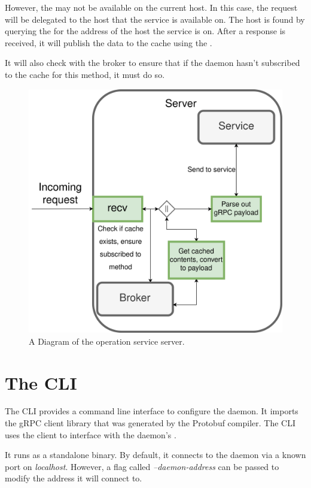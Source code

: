 \documentclass[a4paper,12pt]{report}
\begin{document}
However, the \textit{} may not be available on the current host. In this case, the request will be delegated to the host that the
service is available on. The host is found by querying the \textit{} for the address of the host the service is on.
After a response is received, it will publish the data to the cache using the \textit{}.

It will also check with the broker to ensure that if the daemon hasn't subscribed to the cache for this method, it must do so.

\begin{figure}[hbt!]
    \centering
    \includegraphics[width=\linewidth]{server.png}
    \caption{A Diagram of the operation service server.}
    \label{fig:admin}
\end{figure}

\newpage

\section{The CLI}
\label{sec:cli}
The CLI provides a command line interface to configure the daemon.
It imports the gRPC client library that was generated by the Protobuf compiler. The CLI uses the client to interface with the daemon's \textit{}.

It runs as a standalone binary. By default, it connects to the daemon via a known port on \textit{localhost}. 
However, a flag called \textit{--daemon-address} can be passed to modify the address it will connect to.
\end{document}
